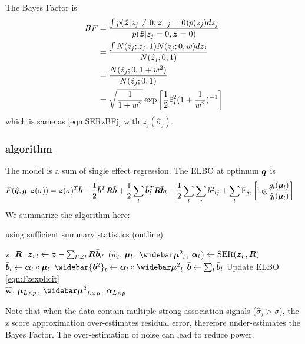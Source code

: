 The Bayes Factor is 
\begin{align}
    BF &= \frac{\int p(\hat {\bm z}|z_j\neq0, \bm z_{-j} = 0)p(z_j) d z_j }{p(\hat {\bm z}|z_j=0, \bm z = 0)} \\
    &= \frac{\int N(\hat{z}_j; z_j,1)N(z_j;0,w)d z_j}{N(\hat{z}_j; 0,1)} \\
    &= \frac{N(\hat{z}_j; 0,1+w^2)}{N(\hat{z}_j; 0,1)} \\
    &= \sqrt{\frac{1}{1+w^2}} \exp{\left[ \frac{1}{2} \hat{z}_j^2 (1+\frac{1}{w^2})^{-1} \right]}
\end{align}
which is same as \eqref{eqn:SERzBFj} with $z_j(\hat{\sigma}_j)$.

\subsubsection{\susie algorithm}
The \susie model is a sum of single effect regression. The ELBO at optimum ${\bm q}$ is
\begin{align}
    F(\hat{{\bm q}},\bm g;\bm{z}(\sigma)) &= \bm{z}(\sigma)^{T} \bar{\bm b} - \frac{1}{2}\bar{\bm b}^T \bm R \bar{\bm b} + \frac{1}{2} \sum_l \bar{\bm b}_l^T \bm R \bar{\bm b}_l - \frac{1}{2} \sum_l \sum_j \bar{b^2}_{lj} + \sum_l \text{E}_{\hat{q}_l}\left[\log\frac{g_l(\bm \mu_l)}{\hat{q}_l(\bm \mu_l)} \right] \label{eqn:Fzexplicit}
\end{align}
We summarize the algorithm here:
\begin{algorithm}[H] 
\caption{\susie using sufficient summary statistics (outline)} \label{alg:susiezalg}
\begin{algorithmic}[1]
\Require $\bm{z}$, $\bm R$.
\Repeat
{}
	\State $\bm{z}_{\bm r l} \gets \bm{z} - \sum_{l'\neq l} \bm R \bar{\bm b}_{l'}$ 
    \State ($\hat{w}_{l}$, $\bm \mu_l$, $\emusq_l$, $\bm \alpha_l$) $\gets \text{SER}(\bm{z}_{\bm r}, \bm R)$ 
    \State $\bar{\bm b}_l \gets \bm \alpha_l \circ \bm \mu_l$ 
    \State $\widebar{\vb^2}_l \gets \valpha_l \circ \emusq_l$ 
\EndFor
\State $\bar{\bm b} \gets \sum_l \bar{\bm b}_l$
\State Update ELBO \eqref{eqn:Fzexplicit}
 \\
\Return $\hat{\bm{w}}$, $\bm \mu_{L\times p}$, $\emusq_{L\times p}$, $\bm \alpha_{L\times p}$
\end{algorithmic}
\end{algorithm}
Note that when the data contain multiple strong association signals ($\hat{\sigma}_j > \sigma$), the z score approximation over-estimates residual error, therefore under-estimates the Bayes Factor. The over-estimation of noise can lead to reduce power.